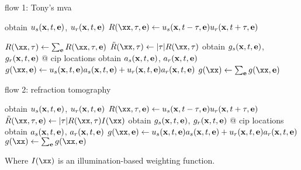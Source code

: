 \begin{frame}[fragile]{flow 1: Tony's mva}
    \begin{algorithm}[H]
        \begin{algorithmic}
                \STATE obtain $u_s({\bf x},t,{\bf e})$, $u_r({\bf x},t,{\bf e})$
                \STATE $R(\xx,\tau,{\bf e}) \leftarrow u_s({\bf x},t-\tau,{\bf e})u_r({\bf x},t+\tau,{\bf e})$

            \ENDFOR
            \STATE $R(\xx,\tau)\leftarrow \sum_{\bf e}R(\xx,\tau,{\bf e})$
            \STATE $\tilde{R}(\xx,\tau) \leftarrow |\tau|R(\xx,\tau)$
                \STATE obtain $g_s({\bf x},t,{\bf e})$, $g_r({\bf x},t,{\bf e})$ @ cip locations
                \STATE obtain $a_s({\bf x},t,{\bf e})$, $a_r({\bf x},t,{\bf e})$
                \STATE $g(\xx,{\bf e}) \leftarrow u_s({\bf x},t,{\bf e})a_s({\bf x},t,{\bf e})+u_r({\bf x},t,{\bf e})a_r({\bf x},t,{\bf e})$
            \ENDFOR
            \STATE  $g(\xx) \leftarrow \sum_{\bf e}g(\xx,{\bf e})$

        \end{algorithmic}
    \end{algorithm}
\end{frame}

\begin{frame}[fragile]{flow 2: refraction tomography}
    \begin{algorithm}[H]
        \begin{algorithmic}
                \STATE obtain $u_s({\bf x},t,{\bf e})$, $u_r({\bf x},t,{\bf e})$
                \STATE $R(\xx,\tau,{\bf e}) \leftarrow u_s({\bf x},t-\tau,{\bf e})u_r({\bf x},t+\tau,{\bf e})$
                \STATE $\tilde{R}(\xx,\tau,{\bf e}) \leftarrow |\tau|R(\xx,\tau) I(\xx)$
                \STATE obtain $g_s({\bf x},t,{\bf e})$, $g_r({\bf x},t,{\bf e})$ @ cip locations
                \STATE obtain $a_s({\bf x},t,{\bf e})$, $a_r({\bf x},t,{\bf e})$
                \STATE $g(\xx,{\bf e}) \leftarrow u_s({\bf x},t,{\bf e})a_s({\bf x},t,{\bf e})+u_r({\bf x},t,{\bf e})a_r({\bf x},t,{\bf e})$
            \ENDFOR
            \STATE  $g(\xx) \leftarrow \sum_{\bf e}g(\xx,{\bf e})$

        \end{algorithmic}
    \end{algorithm}
    Where $I(\xx)$ is an illumination-based weighting function.
\end{frame}




